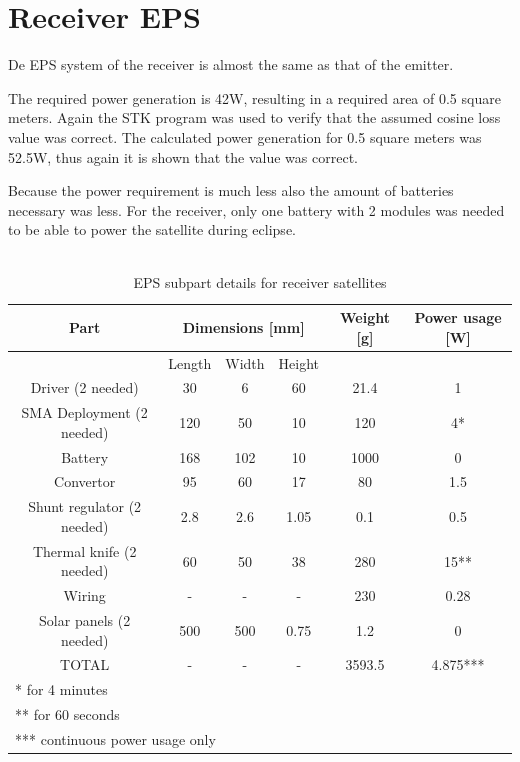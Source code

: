 \section{Receiver EPS}
\label{receiver_EPS}

De EPS system of the receiver is almost the same as that of the emitter.

The required power generation is 42W, resulting in a required area of 0.5 square meters. Again the STK program was used to verify that the assumed cosine loss value was correct. The calculated power generation for 0.5 square meters was 52.5W, thus again it is shown that the value was correct.

Because the power requirement is much less also the amount of batteries necessary was less. For the receiver, only one battery with 2 modules was needed to be able to power the satellite during eclipse.
\\\\

\begin{table}[H!]
\centering
\begin{tabular}{cccccc}
\toprule
Part & \multicolumn{3}{c}{Dimensions [mm]} & Weight [g] & Power usage [W]\\ 
\midrule
 & Length & Width & Height & & \\ 
 Driver (2 needed) & 30 & 6 & 60 & 21.4 & 1 \\ 
 SMA Deployment  (2 needed) & 120 & 50 & 10 & 120 & 4* \\ 
 Battery & 168 & 102 & 10 & 1000 & 0 \\ 
 Convertor & 95 & 60 & 17 & 80 & 1.5 \\ 
 Shunt regulator  (2 needed) & 2.8 & 2.6 & 1.05 & 0.1 & 0.5 \\ 
 Thermal knife (2 needed) & 60 & 50 & 38 & 280 & 15**  \\
 Wiring & - & - & - & 230 & 0.28 \\ 
 Solar panels (2 needed) & 500 & 500 & 0.75 & 1.2 & 0 \\
 \midrule
 TOTAL & - & - & - & 3593.5 & 4.875***  \\ 
\bottomrule
 \multicolumn{6}{l}{* for 4 minutes} \\
 \multicolumn{6}{l}{** for 60 seconds} \\
 \multicolumn{6}{l}{*** continuous power usage only} \\
\end{tabular}
\caption{EPS subpart details for receiver satellites}
\label{tab:EPS_details}
\end{table}


